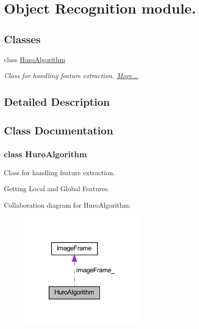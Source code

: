 \hypertarget{group___object_recognition}{\section{Object Recognition module.}
\label{group___object_recognition}
}
\subsection*{Classes}
\begin{DoxyCompactItemize}
\item 
class \hyperlink{group___object_recognition_class_huro_algorithm}{Huro\-Algorithm}
\begin{DoxyCompactList}\small\item\em Class for handling feature extraction.  \hyperlink{group___object_recognition_class_huro_algorithm}{More...}\end{DoxyCompactList}\end{DoxyCompactItemize}


\subsection{Detailed Description}


\subsection{Class Documentation}
\label{class_huro_algorithm}
\hypertarget{group___object_recognition_class_huro_algorithm}{}
\subsubsection{class Huro\-Algorithm}
Class for handling feature extraction. 

Getting Local and Global Features. 

Collaboration diagram for Huro\-Algorithm\-:
\nopagebreak
\begin{figure}[H]
\begin{center}
\leavevmode
\includegraphics[width=182pt]{class_huro_algorithm__coll__graph}
\end{center}
\end{figure}
